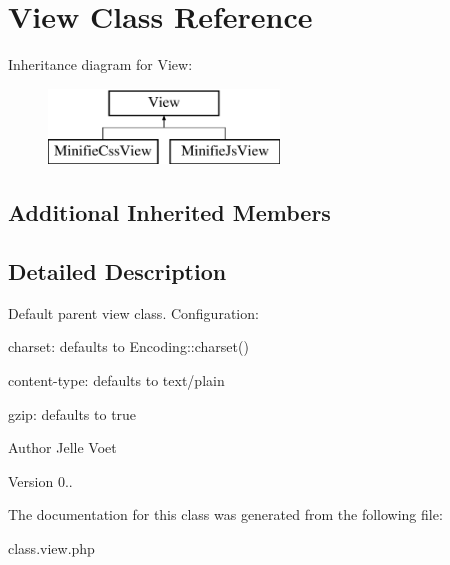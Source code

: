 \hypertarget{class_view}{\section{View Class Reference}
\label{class_view}
}
Inheritance diagram for View\-:\begin{figure}[H]
\begin{center}
\leavevmode
\includegraphics[height=2.000000cm]{class_view}
\end{center}
\end{figure}
\subsection*{Additional Inherited Members}


\subsection{Detailed Description}
Default parent view class. Configuration\-:
\begin{DoxyItemize}
\item charset\-: defaults to Encoding\-::charset()
\item content-\/type\-: defaults to text/plain
\item gzip\-: defaults to true
\end{DoxyItemize}

\begin{DoxyAuthor}{Author}
Jelle Voet 
\end{DoxyAuthor}
\begin{DoxyVersion}{Version}
0.. 
\end{DoxyVersion}


The documentation for this class was generated from the following file\-:\begin{DoxyCompactItemize}
\item 
class.\-view.\-php\end{DoxyCompactItemize}
